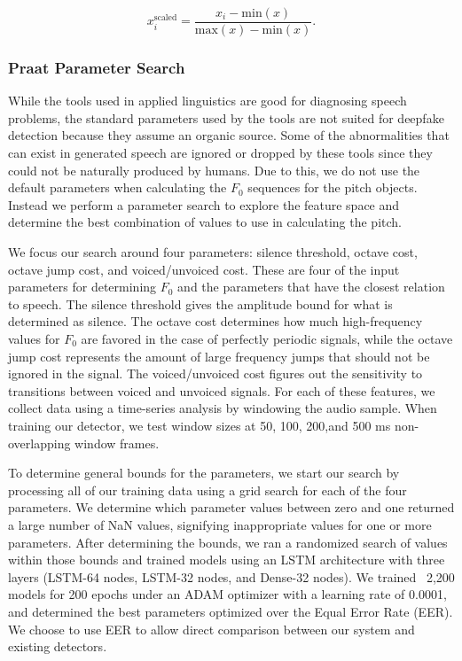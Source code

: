 \documentclass[10pt, journal, anonymous=true]{IEEEtran}
\begin{document}
\begin{equation}
    x_{i}^{\text{scaled}}=\frac{x_i - \text{min}(x)}{\text{max}(x) - \text{min}(x)}.
\end{equation} 

\subsubsection{Praat Parameter Search}
While the tools used in applied linguistics are good for diagnosing speech problems, the standard parameters used by the tools are not suited for deepfake detection because they assume an organic source. Some of the abnormalities that can exist in generated speech are ignored or dropped by these tools since they could not be naturally produced by humans. Due to this, we do not use the default parameters when calculating the $F_0$ sequences for the pitch objects. Instead we perform a parameter search to explore the feature space and determine the best combination of values to use in calculating the pitch. 

We focus our search around four parameters: silence threshold, octave cost, octave jump cost, and voiced/unvoiced cost. These are four of the input parameters for determining $F_0$ and the parameters that have the closest relation to speech. The silence threshold gives the amplitude bound for what is determined as silence. The octave cost determines how much high-frequency values for $F_0$ are favored in the case of perfectly periodic signals, while the octave jump cost represents the amount of large frequency jumps that should not be ignored in the signal. The voiced/unvoiced cost figures 
out the sensitivity to transitions between voiced and unvoiced signals. For each of these features, we collect data using a time-series analysis by windowing the audio sample. When training our detector, we test window sizes at 50, 100, 200,and 500 ms non-overlapping window frames. 

To determine general bounds for the parameters, we start our search by processing all of our training data using a grid search for each of the four parameters. We determine which parameter values between zero and one returned a large number of NaN values, signifying inappropriate values for one or more parameters. After determining the bounds, we ran a randomized search of values within those bounds and trained models using an LSTM architecture with three layers (LSTM-64 nodes, LSTM-32 nodes, and Dense-32 nodes). We trained ~2,200 models
for 200 epochs under an ADAM optimizer with a learning rate of 0.0001, and determined the best parameters optimized over the Equal Error Rate (EER). We choose to use EER to allow direct comparison between our system and existing detectors. 
\end{document}
